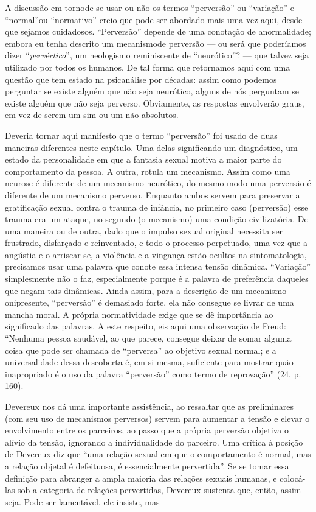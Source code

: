 A discussão em torno\idxpervnorma[|(] de se usar ou não os termos
``perversão'' ou ``variação''\idxvaria{} e
``normal''\idxnorma[|(] ou ``normativo'' creio que pode ser abordado
mais uma vez aqui, desde que sejamos cuidadosos.
``Perversão'' depende de uma conotação de
anormalidade; embora eu tenha descrito um mecanismo\idxmecap[|(] de perversão ---
ou será que poderíamos dizer ``\emph{pervértico}'',
um neologismo reminiscente de ``neurótico''?
--- que talvez seja utilizado por todos os humanos. De tal forma que
retornamos aqui com uma questão que tem estado na psicanálise por
décadas: assim como podemos perguntar se existe alguém que não seja
neurótico, alguns de nós perguntam se existe alguém que não seja
perverso. Obviamente, as respostas envolverão graus, em vez de serem
um sim ou um não absolutos.

Deveria tornar aqui manifesto que o termo
``perversão'' foi usado de duas maneiras
diferentes neste capítulo. Uma delas significando um diagnóstico, um
estado da personalidade em que a fantasia sexual motiva a maior parte
do comportamento da pessoa. A outra, rotula um mecanismo. Assim como
uma neurose é diferente de um mecanismo neurótico, do mesmo modo uma
perversão é diferente de um mecanismo perverso. Enquanto ambos servem
para preservar a gratificação sexual contra o trauma de infância, no
primeiro caso (perversão) esse trauma era um ataque, no segundo (o
mecanismo) uma condição civilizatória. De uma maneira ou de outra, dado
que o impulso sexual original necessita ser frustrado, disfarçado e
reinventado, e todo o processo perpetuado, uma vez que a angústia e o
arriscar-se, a violência e a vingança estão ocultos na sintomatologia,
precisamos usar uma palavra que conote essa intensa tensão dinâmica.
``Variação''\idxvaria{} simplesmente não o faz,
especialmente porque é a palavra de preferência daqueles que negam tais
dinâmicas. Ainda assim, para a descrição de um mecanismo onipresente,
``perversão'' é demasiado forte, ela não
consegue se livrar de uma mancha moral. A própria normatividade exige
que se dê importância ao significado das palavras. A este respeito, eis
aqui uma observação de Freud:\idxfreudperve{} ``Nenhuma pessoa saudável,
ao que parece, consegue deixar de somar alguma coisa que pode ser
chamada de ``perversa'' ao objetivo
sexual normal; e a universalidade dessa descoberta é, em si mesma,
suficiente para mostrar quão inapropriado é o uso da palavra
``perversão'' como termo de
reprovação'' (24, p. 160).

Devereux\idxdever{} nos dá uma importante assistência, ao ressaltar que as
preliminares\idxpreli{} (com seu uso de mecanismos perversos) servem para aumentar
a tensão e elevar o envolvimento entre os parceiros, ao passo que a
própria perversão objetiva o alívio da tensão,\idxdesu{} ignorando a
individualidade do parceiro. Uma crítica à posição de Devereux diz que
``uma relação sexual em que o comportamento é normal, mas
a relação objetal\idxpervrelac{} é defeituosa, é essencialmente pervertida''. Se se
tomar essa definição para abranger a ampla maioria das relações sexuais
humanas, e colocá-las sob a categoria de relações pervertidas, Devereux
sustenta que, então, assim seja. Pode ser lamentável, ele insiste, mas

